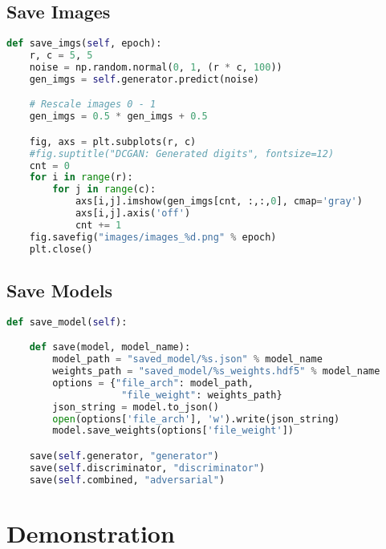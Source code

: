 \subsection{Save Images} %
\label{subsec:save_imgs}
\begin{lstlisting}[basicstyle=\scriptsize,language=Python]
def save_imgs(self, epoch):
    r, c = 5, 5
    noise = np.random.normal(0, 1, (r * c, 100))
    gen_imgs = self.generator.predict(noise)

    # Rescale images 0 - 1
    gen_imgs = 0.5 * gen_imgs + 0.5

    fig, axs = plt.subplots(r, c)
    #fig.suptitle("DCGAN: Generated digits", fontsize=12)
    cnt = 0
    for i in range(r):
        for j in range(c):
            axs[i,j].imshow(gen_imgs[cnt, :,:,0], cmap='gray')
            axs[i,j].axis('off')
            cnt += 1
    fig.savefig("images/images_%d.png" % epoch)
    plt.close()
\end{lstlisting}
\par\bigskip

\subsection{Save Models} %
\label{sub:saving_models}
\begin{lstlisting}[basicstyle=\scriptsize,language=Python]
def save_model(self):

    def save(model, model_name):
        model_path = "saved_model/%s.json" % model_name
        weights_path = "saved_model/%s_weights.hdf5" % model_name
        options = {"file_arch": model_path,
                    "file_weight": weights_path}
        json_string = model.to_json()
        open(options['file_arch'], 'w').write(json_string)
        model.save_weights(options['file_weight'])

    save(self.generator, "generator")
    save(self.discriminator, "discriminator")
    save(self.combined, "adversarial")
\end{lstlisting}
\par\bigskip


\section{Demonstration} %
\label{sec:demonstration}

